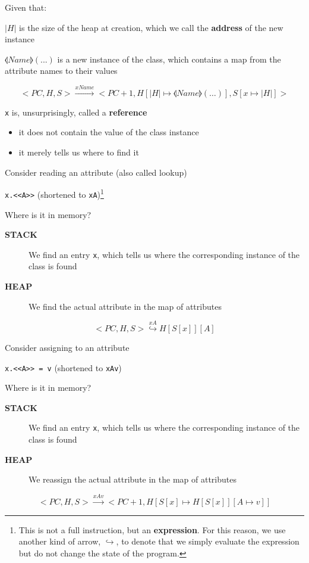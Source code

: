 \documentclass{beamer}
\begin{document}
\begin{slide}{
\item Given that:
\item $|H|$ is the size of the heap at creation, which we call the \textbf{address} of the new instance
\item $\llangle Name \rrangle(...)$ is a new instance of the class, which contains a map from the attribute names to their values

\fontsize{8pt}{7.2}\selectfont
$$<PC,H,S> \overset{xName}{\rightarrow} <PC+1,H[|H| \mapsto \llangle Name \rrangle(\dots)],S[x \mapsto |H|]>$$

\item \texttt{x} is, unsurprisingly, called a \textbf{reference}
\begin{itemize}
\item it does not contain the value of the class instance
\item it merely tells us where to find it
\end{itemize}
}\end{slide}

\begin{slide}{
\item Consider reading an attribute (also called lookup)
\item \texttt{x.<<A>>} (shortened to \texttt{xA})\footnote{\pause This is not a full instruction, but an \textbf{expression}. For this reason, we use another kind of arrow, $\hookrightarrow$, to denote that we simply evaluate the expression but do not change the state of the program.}
\item Where is it in memory?
\begin{description}
\item[\textbf{STACK}] We find an entry \texttt{x}, which tells us where the corresponding instance of the class is found 
\item[\textbf{HEAP}] We find the actual attribute in the map of attributes
\end{description}

$$<PC,H,S> \overset{xA}{\hookrightarrow} H[S[x]][A]$$
}\end{slide}



\begin{slide}{
\item Consider assigning to an attribute
\item \texttt{x.<<A>> = v} (shortened to \texttt{xAv})
\item Where is it in memory?
\begin{description}
\item[\textbf{STACK}] We find an entry \texttt{x}, which tells us where the corresponding instance of the class is found 
\item[\textbf{HEAP}] We reassign the actual attribute in the map of attributes
\end{description}

$$<PC,H,S> \overset{xAv}{\rightarrow} <PC+1,H[S[x] \mapsto H[S[x]][A \mapsto v]]$$
}\end{slide}
\end{document}
